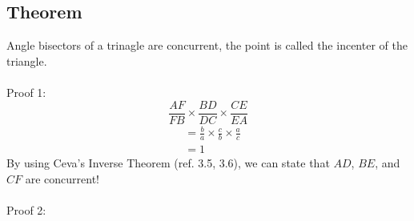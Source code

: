 \documentclass{article}
\begin{document}
\vspace{60px}

\subsection{Theorem}
Angle bisectors of a trinagle are concurrent, the point is called the incenter of the triangle.\\
\\
Proof 1:\\
$$\frac{AF}{FB}\times\frac{BD}{DC}\times\frac{CE}{EA}$$
\begin{align*}
&=\frac{b}{a}\times\frac{c}{b}\times\frac{a}{c}\\
&=1
\end{align*}
By using Ceva's Inverse Theorem (ref. 3.5, 3.6), we can state that $AD$, $BE$, and $CF$ are concurrent!\\
\\
Proof 2:



\end{document}
